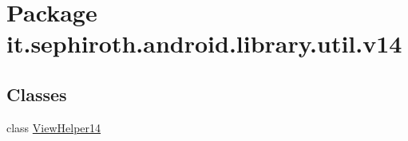 \hypertarget{namespaceit_1_1sephiroth_1_1android_1_1library_1_1util_1_1v14}{}\section{Package it.\+sephiroth.\+android.\+library.\+util.\+v14}
\label{namespaceit_1_1sephiroth_1_1android_1_1library_1_1util_1_1v14}
\subsection*{Classes}
\begin{DoxyCompactItemize}
\item 
class \hyperlink{classit_1_1sephiroth_1_1android_1_1library_1_1util_1_1v14_1_1_view_helper14}{View\+Helper14}
\end{DoxyCompactItemize}
